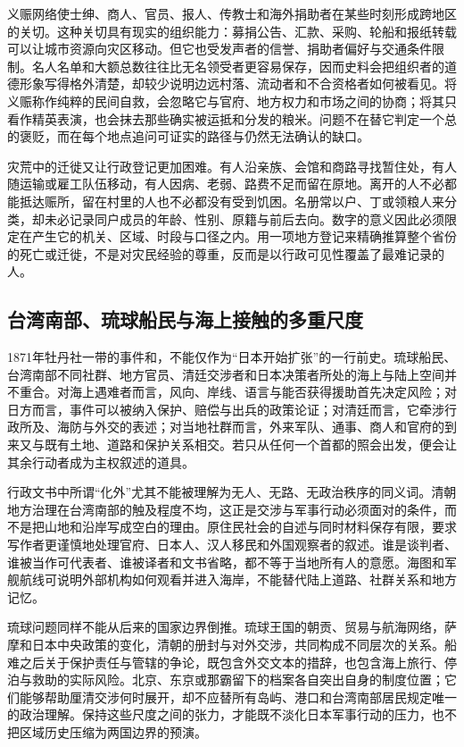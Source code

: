 义赈网络使士绅、商人、官员、报人、传教士和海外捐助者在某些时刻形成跨地区的关切。这种关切具有现实的组织能力：募捐公告、汇款、采购、轮船和报纸转载可以让城市资源向灾区移动。但它也受发声者的信誉、捐助者偏好与交通条件限制。名人名单和大额总数往往比无名领受者更容易保存，因而史料会把组织者的道德形象写得格外清楚，却较少说明边远村落、流动者和不合资格者如何被看见。将义赈称作纯粹的民间自救，会忽略它与官府、地方权力和市场之间的协商；将其只看作精英表演，也会抹去那些确实被运抵和分发的粮米。问题不在替它判定一个总的褒贬，而在每个地点追问可证实的路径与仍然无法确认的缺口。

灾荒中的迁徙又让行政登记更加困难。有人沿亲族、会馆和商路寻找暂住处，有人随运输或雇工队伍移动，有人因病、老弱、路费不足而留在原地。离开的人不必都能抵达赈所，留在村里的人也不必都没有受到饥困。名册常以户、丁或领粮人来分类，却未必记录同户成员的年龄、性别、原籍与前后去向。数字的意义因此必须限定在产生它的机关、区域、时段与口径之内。用一项地方登记来精确推算整个省份的死亡或迁徙，不是对灾民经验的尊重，反而是以行政可见性覆盖了最难记录的人。

\subsection{台湾南部、琉球船民与海上接触的多重尺度}

1871年牡丹社一带的事件和，不能仅作为“日本开始扩张”的一行前史。琉球船民、台湾南部不同社群、地方官员、清廷交涉者和日本决策者所处的海上与陆上空间并不重合。对海上遇难者而言，风向、岸线、语言与能否获得援助首先决定风险；对日方而言，事件可以被纳入保护、赔偿与出兵的政策论证；对清廷而言，它牵涉行政所及、海防与外交的表述；对当地社群而言，外来军队、通事、商人和官府的到来又与既有土地、道路和保护关系相交。若只从任何一个首都的照会出发，便会让其余行动者成为主权叙述的道具。

行政文书中所谓“化外”尤其不能被理解为无人、无路、无政治秩序的同义词。清朝地方治理在台湾南部的触及程度不均，这正是交涉与军事行动必须面对的条件，而不是把山地和沿岸写成空白的理由。原住民社会的自述与同时材料保存有限，要求写作者更谨慎地处理官府、日本人、汉人移民和外国观察者的叙述。谁是谈判者、谁被当作可代表者、谁被译者和文书省略，都不等于当地所有人的意愿。海图和军舰航线可说明外部机构如何观看并进入海岸，不能替代陆上道路、社群关系和地方记忆。

琉球问题同样不能从后来的国家边界倒推。琉球王国的朝贡、贸易与航海网络，萨摩和日本中央政策的变化，清朝的册封与对外交涉，共同构成不同层次的关系。船难之后关于保护责任与管辖的争论，既包含外交文本的措辞，也包含海上旅行、停泊与救助的实际风险。北京、东京或那霸留下的档案各自突出自身的制度位置；它们能够帮助厘清交涉何时展开，却不应替所有岛屿、港口和台湾南部居民规定唯一的政治理解。保持这些尺度之间的张力，才能既不淡化日本军事行动的压力，也不把区域历史压缩为两国边界的预演。

